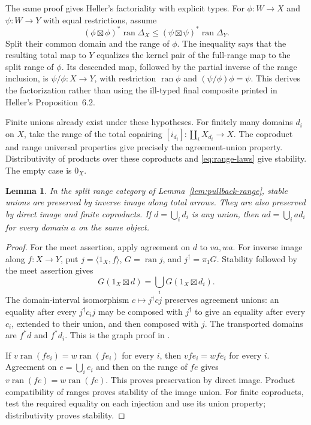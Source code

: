 \documentclass[11pt]{article}
\newtheorem{lemma}[theorem]{Lemma}
\theoremstyle{definition}\newtheorem{definition}[theorem]{Definition}
\theoremstyle{remark}\newtheorem{remark}[theorem]{Remark}
\newcommand{\ran}{\operatorname{ran}}
\begin{document}
The same proof gives Heller's factoriality with explicit types.
For $\phi:W\to X$ and $\psi:W\to Y$ with equal restrictions,
assume
\[
 (\phi\boxtimes\phi)^*\ran\Delta_X
 \le(\psi\boxtimes\psi)^*\ran\Delta_Y.
\]
Split their common domain and the range of $\phi$. The inequality
says that the resulting total map to $Y$ equalizes the kernel pair
of the full-range map to the split range of $\phi$. Its descended
map, followed by the partial inverse of the range inclusion, is
$\psi/\phi:X\to Y$, with restriction $\ran\phi$ and
$(\psi/\phi)\phi=\psi$. This derives the factorization rather
than using the ill-typed final composite printed in Heller's
Proposition~6.2.

Finite unions already exist under these hypotheses. For finitely
many domains $d_i$ on $X$, take the range of the total copairing
$[i_{d_i}]:\coprod_iX_{d_i}\to X$. The coproduct and range
universal properties give precisely the agreement-union property.
Distributivity of products over these coproducts and
\eqref{eq:range-laws} give stability. The empty case is $0_X$.

\begin{lemma}\label{lem:unions}
In the split range category of Lemma~\ref{lem:pullback-range},
stable unions are preserved by inverse image along total arrows.
They are also preserved by direct image and finite coproducts.
If $d=\bigcup_i d_i$ is any union, then
$ad=\bigcup_i ad_i$ for every domain $a$ on the same object.
\end{lemma}
\begin{proof}
For the meet assertion, apply agreement on $d$ to $va,wa$.
For inverse image along $f:X\to Y$, put
$j=\langle1_X,f\rangle$, $G=\ran j$, and
$j^\dagger=\pi_1G$. Stability followed by the meet assertion gives
\[
 G(1_X\boxtimes d)=\bigcup_i G(1_X\boxtimes d_i).
\]
The domain-interval isomorphism $c\mapsto j^\dagger c j$
preserves agreement unions: an equality after every
$j^\dagger c_i j$ may be composed with $j^\dagger$ to give an
equality after every $c_i$, extended to their union, and then
composed with $j$. The transported domains are $f^*d$ and
$f^*d_i$. This is the graph proof in
\cite[\S7.1, Proposition on inverse images]{Repairs}.

If $v\ran(fe_i)=w\ran(fe_i)$ for every $i$, then
$vfe_i=wfe_i$ for every $i$. Agreement on $e=\bigcup_i e_i$
and then on the range of $fe$ gives
$v\ran(fe)=w\ran(fe)$. This proves preservation by direct
image. Product compatibility of ranges proves stability of the
image union. For finite coproducts, test the required equality on
each injection and use its union property; distributivity proves
stability.
\end{proof}
\end{document}
